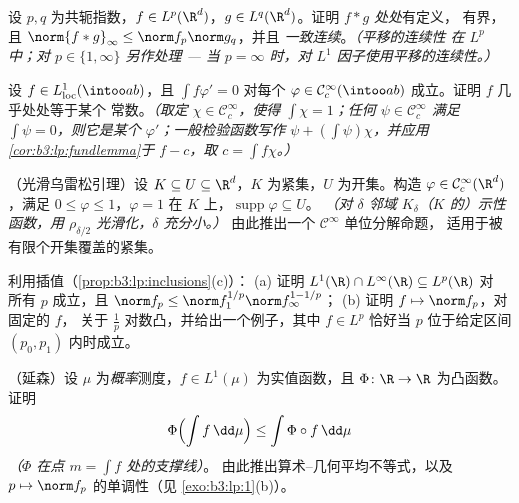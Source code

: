 \begin{exercise}[$\star\star$]\label{exo:b3:lp:6}
设 $p, q$ 为共轭指数，$f \in L^p(\R^d)$，$g \in
L^q(\R^d)$。证明 $f * g$ \emph{处处}有定义，
有界，且 $\norm{f*g}_\infty \leq \norm f_p\norm g_q$，并且
\emph{一致连续}。\emph{（平移的连续性
在 $L^p$ 中；对 $p \in \{1, \infty\}$ 另作处理 --- 当 $p =
\infty$ 时，对 $L^1$ 因子使用平移的连续性。）}
\end{exercise}

\begin{exercise}[$\star\star$]\label{exo:b3:lp:7}
设 $f \in L^1_{\mathrm{loc}}(\intoo ab)$，且
$\int f\varphi' = 0$ 对每个 $\varphi \in \mathcal
C^\infty_c(\intoo ab)$ 成立。证明 $f$ 几乎处处等于某个
常数。\emph{（取定 $\chi \in \mathcal C_c^\infty$，使得
$\int\chi = 1$；任何 $\psi \in \mathcal C_c^\infty$ 满足
$\int\psi = 0$，则它是某个 $\varphi'$；一般检验函数写作
$\psi + (\int\psi)\chi$，并应用
\cref{cor:b3:lp:fundlemma}于 $f - c$，取 $c = \int
f\chi$。）}
\end{exercise}

\begin{exercise}[$\star\star\star$]\label{exo:b3:lp:8}
（光滑乌雷松引理）设 $K \subseteq U \subseteq \R^d$，$K$
为紧集，$U$ 为开集。构造 $\varphi \in \mathcal
C^\infty_c(\R^d)$，满足 $0 \leq \varphi \leq 1$，$\varphi = 1$
在 $K$ 上，$\operatorname{supp}\varphi \subseteq U$。
\emph{（对 $\delta$ 邻域
$K_\delta$（$K$ 的）示性函数，用 $\rho_{\delta/2}$ 光滑化，$\delta$ 充分小。）}
由此推出一个 $\mathcal C^\infty$ 单位分解命题，
适用于被有限个开集覆盖的紧集。
\end{exercise}

\begin{exercise}[$\star\star$]\label{exo:b3:lp:9}
利用插值（\cref{prop:b3:lp:inclusions}(c)）：
(a) 证明 $L^1(\R)\cap L^\infty(\R) \subseteq L^p(\R)$ 对
所有 $p$ 成立，且 $\norm f_p \leq \norm f_1^{1/p}\norm
f_\infty^{1 - 1/p}$；
(b) 证明 $f \mapsto \norm f_p$，对固定的 $f$，
关于 $\frac1p$ 对数凸，并给出一个例子，其中 $f \in L^p$
恰好当 $p$ 位于给定区间 $(p_0, p_1)$ 内时成立。
\end{exercise}

\begin{exercise}[$\star\star$]\label{exo:b3:lp:10}
（延森）设 $\mu$ 为\emph{概率}测度，$f \in
L^1(\mu)$ 为实值函数，且 $\Phi \colon \R \to \R$ 为凸函数。证明
\[
\Phi\Bigl(\int f\,\dd\mu\Bigr) \leq \int \Phi\circ
f\,\dd\mu
\]
\emph{（$\Phi$ 在点 $m = \int f$ 处的支撑线）}。
由此推出算术–几何平均不等式，以及
$p \mapsto \norm f_p$ 的单调性（见
\cref{exo:b3:lp:1}(b)）。
\end{exercise}

